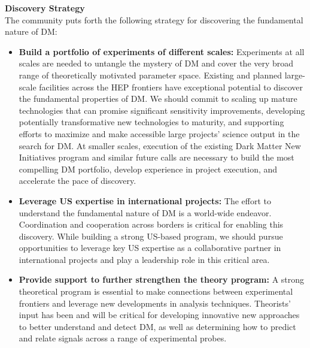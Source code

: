 \documentclass[nofootinbib]{article}
\begin{document}
\noindent
{\bf Discovery Strategy}\\
The community puts forth the following strategy for discovering the fundamental nature of DM:
\begin{itemize}
\item \textbf{Build a portfolio of experiments of different scales:}
Experiments at all scales are needed to untangle the mystery of DM and cover the very broad range of theoretically motivated parameter space. Existing and planned large-scale facilities across the HEP frontiers have exceptional potential to discover the fundamental properties of DM.
We should commit to scaling up mature technologies that can promise significant sensitivity improvements, developing potentially transformative new technologies to maturity, and supporting efforts to maximize and make accessible large projects' science output in the search for DM.
At smaller scales, execution of the existing Dark Matter New Initiatives program and similar future calls are necessary to build the most compelling DM portfolio, develop experience in project execution, and accelerate the pace of discovery. 

\item \textbf{Leverage US expertise in international projects:}
The effort to understand the fundamental nature of DM is a world-wide endeavor. Coordination and cooperation across borders is critical for enabling this discovery. While building a strong US-based program, we should pursue opportunities to leverage key US expertise as a collaborative partner in international projects and play a leadership role in this critical area.  

\item \textbf{Provide support to further strengthen the theory program:}
A strong theoretical program is essential to make connections between experimental frontiers and leverage new developments in analysis techniques. Theorists' input has been and will be critical for developing innovative new approaches to better understand and detect DM, as well as determining how to predict and relate signals across a range of experimental probes.



\end{itemize}
\end{document}
